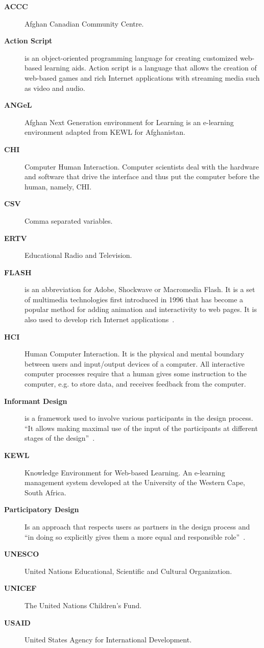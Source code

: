 

\begin{description}
\item[\textbf{ACCC}] Afghan Canadian Community Centre.
\item[\textbf{Action Script}] is an object-oriented programming language 
for creating customized web-based learning aids.  Action script 
is a language that allows the creation of web-based games and rich 
Internet applications with streaming media such as video and audio. 
\item[\textbf{ANGeL}]  Afghan Next Generation environment for Learning is an 
e-learning environment adapted from KEWL for Afghanistan.
\item[\textbf{CHI}] Computer Human Interaction.  Computer scientists 
deal with the hardware and software that drive the interface and 
thus put the computer before the human, namely, CHI.
\item[\textbf{CSV}] Comma separated variables.
\item[\textbf{ERTV}] Educational Radio and Television.
\item[\textbf{FLASH}]  is an abbreviation for Adobe, Shockwave or Macromedia 
Flash.  It is a set of multimedia technologies first introduced 
in 1996 that has become a popular method for adding animation 
and interactivity to web pages. It is also used to develop rich Internet 
applications~\cite{allaire02}.
\item[\textbf{HCI}] Human Computer Interaction. It is the physical and mental 
boundary between users and input/output devices of a computer. All 
interactive computer processes require that a human gives some instruction 
to the computer, e.g. to store data, and receives feedback from the computer.
\item[\textbf{Informant Design}] is a framework used to involve various participants 
in the design process. ``It allows making maximal use of the input 
of the participants at different stages of the design''~\cite{scaife97}.
\item[\textbf{KEWL}] Knowledge Environment for Web-based Learning.  An e-learning 
management system developed at the University of the Western Cape, 
South Africa.
\item[\textbf{Participatory Design}]  Is an approach that respects users as 
partners in the design process and ``in doing so explicitly gives them 
a more equal and responsible role''~\cite{scaife97}.
\item[\textbf{UNESCO}] United Nations Educational, Scientific and Cultural Organization.
\item[\textbf{UNICEF}] The United Nations Children's Fund.
\item[\textbf{USAID}] United States Agency for International Development.

\end{description}

